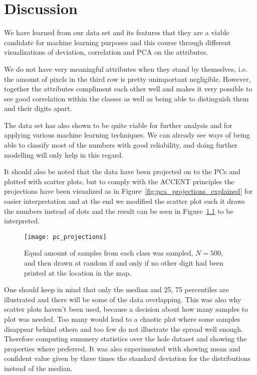 \chapter{Discussion}
We have learned from our data set and its features that they are a viable candidate for machine learning purposes and this course through different visualizations of deviation, correlation and PCA on the attributes. 

We do not have very meaningful attributes when they stand by themselves, i.e. the amount of pixels in the third row is pretty unimportant negligible. However, together the attributes compliment each other well and makes it very possible to see good correlation within the classes as well as being able to distinguish them and their digits apart.

The data set has also shown to be quite viable for further analysis and for applying various machine learning techniques. We can already see ways of being able to classify most of the numbers with good reliability, and doing further modelling will only help in this regard.

It should also be noted that the data have been projected on to the PCs and plotted with scatter plots, but to comply with the ACCENT principles the projections have been visualized as in Figure~\ref{fig:pca_projections_explained} for easier interpretation and at the end we modified the scatter plot such it draws the numbers instead of dots and the result can be seen in Figure~\ref{fig:pc_projections} to be interpreted. 

\begin{figure}[H]
\centering
\texttt{[image: pc\_projections]}
\caption{Equal amount of samples from each class was sampled, $N=500$, and then drawn at random if and only if no other digit had been printed at the location in the map. \label{fig:pc_projections}}
\end{figure}
  
One should keep in mind that only the median and 25, 75 percentiles are illustrated and there will be some of the data overlapping. This was also why scatter plots haven’t been used, because a decision about how many samples to plot was needed. Too many would lead to a chaotic plot where some samples disappear behind others and too few do not illustrate the spread well enough. Therefore computing summery statistics over the hole dataset and showing the properties where preferred. It was also experimented with showing mean and confident value given by three times the standard deviation for the distributions instead of the median.

